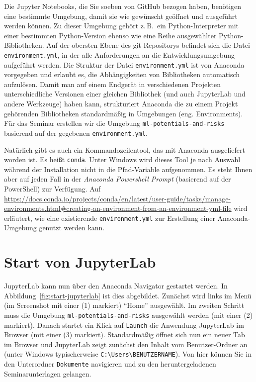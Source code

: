 \documentclass{tufte-handout}
\begin{document}
Die Jupyter Notebooks, die Sie soeben von GitHub bezogen haben, benötigen eine bestimmte Umgebung, damit sie wie gewünscht geöffnet und ausgeführt werden können.
Zu dieser Umgebung gehört z.\,B.\ ein Python-Interpreter mit einer bestimmten Python-Version ebenso wie eine Reihe ausgewählter Python-Bibliotheken.
Auf der obersten Ebene des git-Repositorys befindet sich die Datei \texttt{environment.yml}, in der alle Anforderungen an die Entwicklungsumgebung aufgeführt werden.
Die Struktur der Datei \texttt{environment.yml} ist von Anaconda vorgegeben und erlaubt es, die Abhängigkeiten von Bibliotheken automatisch aufzulösen.
Damit man auf einem Endgerät in verschiedenen Projekten unterschiedliche Versionen einer gleichen Bibliothek (und auch JupyterLab und andere Werkzeuge) haben kann,
strukturiert Anaconda die zu einem Projekt gehörenden Bibliotheken standardmäßig in Umgebungen (eng. Environments).
Für das Seminar erstellen wir die Umgebung
\texttt{ml-potentials-and-risks}
basierend auf der gegebenen \texttt{environment.yml}.

Natürlich gibt es auch ein Kommandozeilentool, das mit Anaconda ausgeliefert worden ist.
Es heißt \texttt{conda}.
Unter Windows wird dieses Tool je nach Auswahl während der Installation nicht in die Pfad-Variable aufgenommen.
Es steht Ihnen aber auf jeden Fall in der
\emph{Anaconda Powershell Prompt} (basierend auf der PowerShell)
zur Verfügung.
Auf
\url{https://docs.conda.io/projects/conda/en/latest/user-guide/tasks/manage-environments.html#creating-an-environment-from-an-environment-yml-file}
wird erläutert, wie eine existierende \texttt{environment.yml} zur Erstellung einer Anaconda-Umgebung genutzt werden kann.

\section{Start von JupyterLab}

JupyterLab kann nun über den Anaconda Navigator gestartet werden.
In Abbildung~\ref{fig:start-jupyterlab} ist dies abgebildet.
Zunächst wird links im Menü
(im Screenshot mit einer (1) markiert)
\enquote{Home} ausgewählt.
Im zweiten Schritt muss die Umgebung
\texttt{ml-potentials-and-risks}
ausgewählt werden
(mit einer (2) markiert).
Danach startet ein Klick auf \texttt{Launch} die Anwendung JupyterLab im Browser
(mit einer (3) markiert).
Standardmäßig öffnet sich nun ein neuer Tab im Browser und JupyterLab zeigt zunächst den Inhalt vom Benutzer-Ordner an (unter Windows typischerweise \texttt{C:\textbackslash{}Users\textbackslash{}BENUTZERNAME}).
Von hier können Sie in den Unterordner \texttt{Dokumente} navigieren und zu den heruntergeladenen Seminarunterlagen gelangen.
\end{document}
